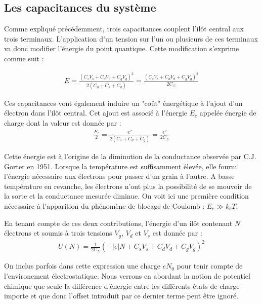\subsection{Les capacitances du système}
Comme expliqué précédemment, trois capacitances couplent l'il\^ot central aux trois terminaux. L'application d'un tension sur l'un ou plusieurs de ces terminaux va donc modifier l'énergie du point quantique. Cette modification s'exprime comme suit :

\begin{eqnarray}
E = \frac{(C_sV_s + C_dV_d + C_gV_g)^2}{2(C_g + C_s + C_g)}=\frac{(C_sV_s + C_dV_d + C_gV_g)^2}{2C_{\Sigma}} \nonumber
\end{eqnarray}




Ces capacitances vont également induire un "co\^ut" énergétique à l'ajout d'un électron dans l'il\^ot central. Cet ajout est associé à l'énergie $E_c$ appelée énergie de charge dont la valeur est donnée par :
\begin{eqnarray}
\frac{E_c}{2} = \frac{e^2}{2(C_s+C_d+C_g)}=\frac{e^2}{2C_{\Sigma}} \nonumber
\end{eqnarray}


Cette énergie est à l'origine de la diminution de la conductance observée par C.J. Gorter en 1951. Lorsque la température est suffisamment élevée, elle fourni l'énergie nécessaire aux électrons pour passer d'un grain à l'autre. A basse température en revanche, les électrons n'ont plus la possibilité de se mouvoir de la sorte et la conductance mesurée diminue. On voit ici une première condition nécessaire à l'apparition du phénomène de blocage de Coulomb : $E_c \gg k_bT$.

En tenant compte de ces deux contributions, l'énergie d'un il\^ot contenant $N$ électrons et soumis à trois tensions $V_g$, $V_d$ et $V_s$ est donnée par :
\begin{eqnarray}
U(N) = \frac{1}{2C_{\Sigma}} (-|e|N + C_sV_s + C_dV_d + C_gV_g)^2
\end{eqnarray}

On inclus parfois dans cette expression une charge $eN_0$ pour tenir compte de l'environement électrostatique. Nous verrons en abordant la notion de potentiel chimique que seule la différence d'énergie entre les différents états de charge importe et que donc l'offset introduit par ce dernier terme peut \^etre ignoré. \newline


